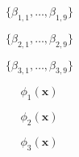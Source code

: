 \documentclass[10pt,twoside]{book}
\newcommand{\fat}[1]{\mathbf{#1}} %
\begin{document}
$$
\{ \beta_{1,1}, \ldots, \beta_{1,9} \}
$$

$$
\{ \beta_{2,1}, \ldots, \beta_{2,9} \}
$$

$$
\{ \beta_{3,1}, \ldots, \beta_{3,9} \}
$$

$$
\phi_1( \fat{x} ) 
$$

$$
\phi_2( \fat{x} ) 
$$

$$
\phi_3( \fat{x} ) 
$$
\end{document}
